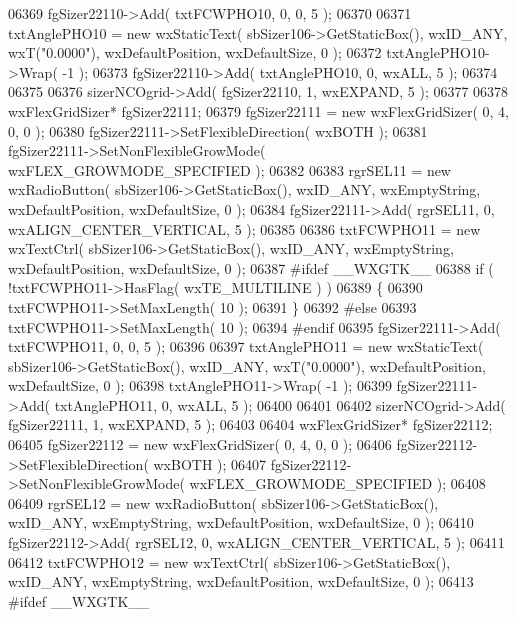 \begin{DoxyCode}
06369     fgSizer22110->Add( txtFCWPHO10, 0, 0, 5 );
06370     
06371     txtAnglePHO10 = \textcolor{keyword}{new} wxStaticText( sbSizer106->GetStaticBox(), wxID\_ANY, wxT(\textcolor{stringliteral}{"0.0000"}), 
      wxDefaultPosition, wxDefaultSize, 0 );
06372     txtAnglePHO10->Wrap( -1 );
06373     fgSizer22110->Add( txtAnglePHO10, 0, wxALL, 5 );
06374     
06375     
06376     sizerNCOgrid->Add( fgSizer22110, 1, wxEXPAND, 5 );
06377     
06378     wxFlexGridSizer* fgSizer22111;
06379     fgSizer22111 = \textcolor{keyword}{new} wxFlexGridSizer( 0, 4, 0, 0 );
06380     fgSizer22111->SetFlexibleDirection( wxBOTH );
06381     fgSizer22111->SetNonFlexibleGrowMode( wxFLEX\_GROWMODE\_SPECIFIED );
06382     
06383     rgrSEL11 = \textcolor{keyword}{new} wxRadioButton( sbSizer106->GetStaticBox(), wxID\_ANY, wxEmptyString, wxDefaultPosition, 
      wxDefaultSize, 0 );
06384     fgSizer22111->Add( rgrSEL11, 0, wxALIGN\_CENTER\_VERTICAL, 5 );
06385     
06386     txtFCWPHO11 = \textcolor{keyword}{new} wxTextCtrl( sbSizer106->GetStaticBox(), wxID\_ANY, wxEmptyString, wxDefaultPosition, 
      wxDefaultSize, 0 );
06387 \textcolor{preprocessor}{    #ifdef \_\_WXGTK\_\_}
06388     \textcolor{keywordflow}{if} ( !txtFCWPHO11->HasFlag( wxTE\_MULTILINE ) )
06389     \{
06390     txtFCWPHO11->SetMaxLength( 10 );
06391     \}
06392 \textcolor{preprocessor}{    #else}
06393     txtFCWPHO11->SetMaxLength( 10 );
06394 \textcolor{preprocessor}{    #endif}
06395     fgSizer22111->Add( txtFCWPHO11, 0, 0, 5 );
06396     
06397     txtAnglePHO11 = \textcolor{keyword}{new} wxStaticText( sbSizer106->GetStaticBox(), wxID\_ANY, wxT(\textcolor{stringliteral}{"0.0000"}), 
      wxDefaultPosition, wxDefaultSize, 0 );
06398     txtAnglePHO11->Wrap( -1 );
06399     fgSizer22111->Add( txtAnglePHO11, 0, wxALL, 5 );
06400     
06401     
06402     sizerNCOgrid->Add( fgSizer22111, 1, wxEXPAND, 5 );
06403     
06404     wxFlexGridSizer* fgSizer22112;
06405     fgSizer22112 = \textcolor{keyword}{new} wxFlexGridSizer( 0, 4, 0, 0 );
06406     fgSizer22112->SetFlexibleDirection( wxBOTH );
06407     fgSizer22112->SetNonFlexibleGrowMode( wxFLEX\_GROWMODE\_SPECIFIED );
06408     
06409     rgrSEL12 = \textcolor{keyword}{new} wxRadioButton( sbSizer106->GetStaticBox(), wxID\_ANY, wxEmptyString, wxDefaultPosition, 
      wxDefaultSize, 0 );
06410     fgSizer22112->Add( rgrSEL12, 0, wxALIGN\_CENTER\_VERTICAL, 5 );
06411     
06412     txtFCWPHO12 = \textcolor{keyword}{new} wxTextCtrl( sbSizer106->GetStaticBox(), wxID\_ANY, wxEmptyString, wxDefaultPosition, 
      wxDefaultSize, 0 );
06413 \textcolor{preprocessor}{    #ifdef \_\_WXGTK\_\_}

\end{DoxyCode}
